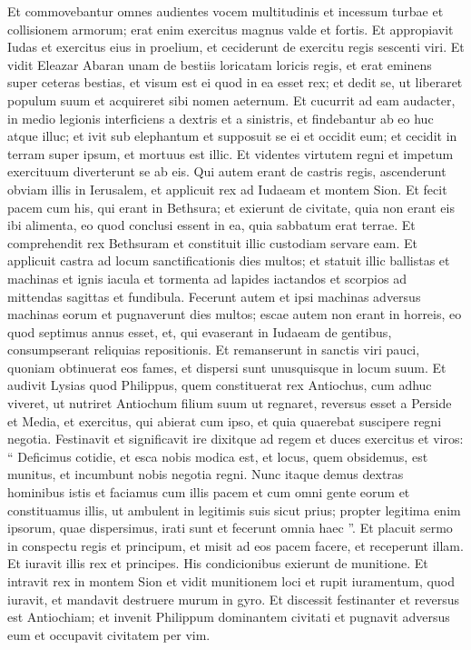 \begin{biblechapter}
\begin{biblechapter}
\begin{biblechapter}
\begin{biblechapter}
\begin{biblechapter}
\begin{biblechapter}
\verse Et commovebantur omnes audientes vocem multitudinis et incessum turbae et collisionem armorum; erat enim exercitus magnus valde et fortis. 
 \verse Et appropiavit Iudas et exercitus eius in proelium, et ceciderunt de exercitu regis sescenti viri.
 \verse Et vidit Eleazar Abaran unam de bestiis loricatam loricis regis, et erat eminens super ceteras bestias, et visum est ei quod in ea esset rex; 
\verse et dedit se, ut liberaret populum suum et acquireret sibi nomen aeternum. 
\verse Et cucurrit ad eam audacter, in medio legionis interficiens a dextris et a sinistris, et findebantur ab eo huc atque illuc; 
\verse et ivit sub elephantum et supposuit se ei et occidit eum; et cecidit in terram super ipsum, et mortuus est illic.
 \verse Et videntes virtutem regni et impetum exercituum diverterunt se ab eis. 
 \verse Qui autem erant de castris regis, ascenderunt obviam illis in Ierusalem, et applicuit rex ad Iudaeam et montem Sion. 
\verse Et fecit pacem cum his, qui erant in Bethsura; et exierunt de civitate, quia non erant eis ibi alimenta, eo quod conclusi essent in ea, quia sabbatum erat terrae. 
\verse Et comprehendit rex Bethsuram et constituit illic custodiam servare eam. 
\verse Et applicuit castra ad locum sanctificationis dies multos; et statuit illic ballistas et machinas et ignis iacula et tormenta ad lapides iactandos et scorpios ad mittendas sagittas et fundibula. 
\verse Fecerunt autem et ipsi machinas adversus machinas eorum et pugnaverunt dies multos; 
\verse escae autem non erant in horreis, eo quod septimus annus esset, et, qui evaserant in Iudaeam de gentibus, consumpserant reliquias repositionis. 
\verse Et remanserunt in sanctis viri pauci, quoniam obtinuerat eos fames, et dispersi sunt unusquisque in locum suum.
 \verse Et audivit Lysias quod Philippus, quem constituerat rex Antiochus, cum adhuc viveret, ut nutriret Antiochum filium suum ut regnaret, 
\verse reversus esset a Perside et Media, et exercitus, qui abierat cum ipso, et quia quaerebat suscipere regni negotia. 
\verse Festinavit et significavit ire dixitque ad regem et duces exercitus et viros: “ Deficimus cotidie, et esca nobis modica est, et locus, quem obsidemus, est munitus, et incumbunt nobis negotia regni. 
\verse Nunc itaque demus dextras hominibus istis et faciamus cum illis pacem et cum omni gente eorum 
\verse et constituamus illis, ut ambulent in legitimis suis sicut prius; propter legitima enim ipsorum, quae dispersimus, irati sunt et fecerunt omnia haec ”. 
\verse Et placuit sermo in conspectu regis et principum, et misit ad eos pacem facere, et receperunt illam. 
\verse Et iuravit illis rex et principes. His condicionibus exierunt de munitione. 
\verse Et intravit rex in montem Sion et vidit munitionem loci et rupit iuramentum, quod iuravit, et mandavit destruere murum in gyro. 
\verse Et discessit festinanter et reversus est Antiochiam; et invenit Philippum dominantem civitati et pugnavit adversus eum et occupavit civitatem per vim.
 

\end{biblechapter}
\end{biblechapter}
\end{biblechapter}
\end{biblechapter}
\end{biblechapter}
\end{biblechapter}
